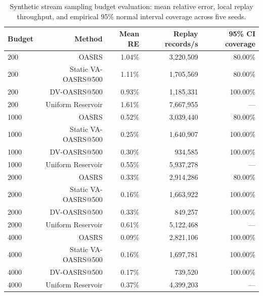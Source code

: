 \documentclass[conference]{IEEEtran}
\begin{document}
\begin{table}[!t]
\centering
\caption{Synthetic stream sampling budget evaluation: mean relative error, local replay throughput, and empirical 95\% normal interval coverage across five seeds.}
\label{tab:budget}
\small
\begin{tabular}{lrrrr}
\toprule
\textbf{Budget} & \textbf{Method} & \textbf{Mean RE} & \textbf{Replay records/s} & \textbf{95\% CI coverage} \\
\midrule
200 & OASRS & 1.04\% & 3,220,509 & 80.00\% \\
200 & Static VA-OASRS@500 & 1.11\% & 1,705,569 & 80.00\% \\
200 & DV-OASRS@500 & 0.93\% & 1,185,331 & 100.00\% \\
200 & Uniform Reservoir & 1.61\% & 7,667,955 & --- \\
1000 & OASRS & 0.52\% & 3,039,440 & 80.00\% \\
1000 & Static VA-OASRS@500 & 0.25\% & 1,640,907 & 100.00\% \\
1000 & DV-OASRS@500 & 0.30\% & 934,585 & 100.00\% \\
1000 & Uniform Reservoir & 0.55\% & 5,937,278 & --- \\
2000 & OASRS & 0.33\% & 2,914,286 & 80.00\% \\
2000 & Static VA-OASRS@500 & 0.16\% & 1,663,922 & 100.00\% \\
2000 & DV-OASRS@500 & 0.33\% & 849,257 & 100.00\% \\
2000 & Uniform Reservoir & 0.61\% & 5,122,468 & --- \\
4000 & OASRS & 0.09\% & 2,821,106 & 100.00\% \\
4000 & Static VA-OASRS@500 & 0.16\% & 1,697,781 & 100.00\% \\
4000 & DV-OASRS@500 & 0.17\% & 739,520 & 100.00\% \\
4000 & Uniform Reservoir & 0.37\% & 4,399,203 & --- \\
\bottomrule
\end{tabular}
\end{table}
\end{document}
